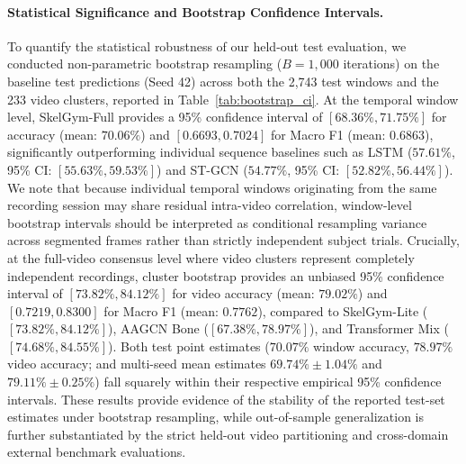 \documentclass[preprint,12pt]{elsarticle}
\begin{document}
\paragraph{Statistical Significance and Bootstrap Confidence Intervals.} To quantify the statistical robustness of our held-out test evaluation, we conducted non-parametric bootstrap resampling ($B=1,000$ iterations) \cite{efron1993} on the baseline test predictions (Seed 42) across both the 2,743 test windows and the 233 video clusters, reported in Table~\ref{tab:bootstrap_ci}. At the temporal window level, SkelGym-Full provides a 95\% confidence interval of $[68.36\%, 71.75\%]$ for accuracy (mean: $70.06\%$) and $[0.6693, 0.7024]$ for Macro F1 (mean: $0.6863$), significantly outperforming individual sequence baselines such as LSTM ($57.61\%$, 95\% CI: $[55.63\%, 59.53\%]$) and ST-GCN ($54.77\%$, 95\% CI: $[52.82\%, 56.44\%]$). We note that because individual temporal windows originating from the same recording session may share residual intra-video correlation, window-level bootstrap intervals should be interpreted as conditional resampling variance across segmented frames rather than strictly independent subject trials. Crucially, at the full-video consensus level where video clusters represent completely independent recordings, cluster bootstrap provides an unbiased 95\% confidence interval of $[73.82\%, 84.12\%]$ for video accuracy (mean: $79.02\%$) and $[0.7219, 0.8300]$ for Macro F1 (mean: $0.7762$), compared to SkelGym-Lite ($[73.82\%, 84.12\%]$), AAGCN Bone ($[67.38\%, 78.97\%]$), and Transformer Mix ($[74.68\%, 84.55\%]$). Both test point estimates ($70.07\%$ window accuracy, $78.97\%$ video accuracy; and multi-seed mean estimates $69.74\% \pm 1.04\%$ and $79.11\% \pm 0.25\%$) fall squarely within their respective empirical 95\% confidence intervals. These results provide evidence of the stability of the reported test-set estimates under bootstrap resampling, while out-of-sample generalization is further substantiated by the strict held-out video partitioning and cross-domain external benchmark evaluations.
\end{document}
